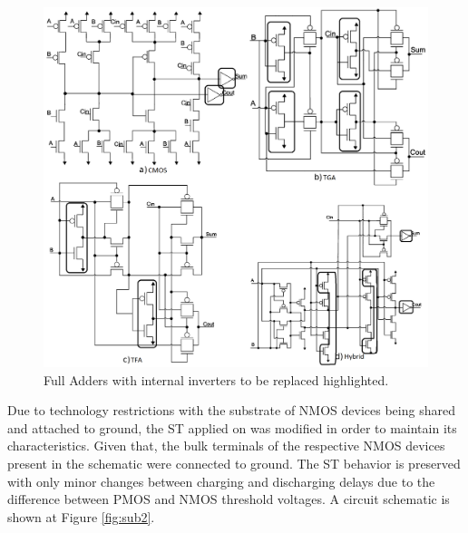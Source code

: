 \documentclass[ecp,tc, english]{iiufrgs}
\begin{document}
\begin{figure}[ht]
\centering
\includegraphics[width=1\textwidth]{FULLADDERS.png}
\caption{Full Adders with internal inverters to be replaced highlighted.}
\label{fig:Fig5}
\end{figure}

Due to technology restrictions with the substrate of NMOS devices being shared and attached to ground, the ST applied on \cite{dokania2015circuit} was modified in order to maintain its characteristics. Given that, the bulk terminals of the respective NMOS devices present in the schematic were connected to ground. The ST behavior is preserved with only minor changes between charging and discharging delays due to the difference between PMOS and NMOS threshold voltages. A circuit schematic is shown at Figure \ref{fig:sub2}.
\end{document}
